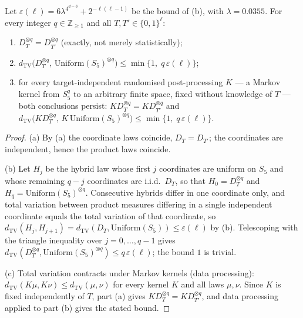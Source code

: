 \documentclass[version=final]{iacrcc}
\newcommand{\dtv}{d_{\mathrm{TV}}}
\begin{document}
\begin{corollary}
\label{cor:terminal}
Let $\varepsilon(\ell) = 6\lambda^{4^{d-3}} + 2^{-\ell(\ell-1)}$ be the bound of
(b), with $\lambda = 0.0355$. For every integer
$q \in \mathbb{Z}_{\geq 1}$ and all $T, T' \in \{0,1\}^\ell$:
\begin{enumerate}[label=(\alph*),nosep]
\item $D_T^{\otimes q} = D_{T'}^{\otimes q}$ (exactly, not merely
  statistically);
\item $\dtv\bigl(D_T^{\otimes q},\, \mathrm{Uniform}(S_5)^{\otimes q}\bigr)
  \leq \min\{1,\; q\,\varepsilon(\ell)\}$;
\item for every target-independent randomised post-processing $K$ --- a Markov
  kernel from $S_5^q$ to an arbitrary finite space, fixed without knowledge of
  $T$ --- both conclusions persist:
  $K D_T^{\otimes q} = K D_{T'}^{\otimes q}$ and
  $\dtv\bigl(K D_T^{\otimes q},\, K\,\mathrm{Uniform}(S_5)^{\otimes q}\bigr)
  \leq \min\{1,\; q\,\varepsilon(\ell)\}$.
\end{enumerate}
\end{corollary}

\begin{proof}
(a) By (a) the coordinate laws coincide, $D_T = D_{T'}$; the
coordinates are independent, hence the product laws coincide.

(b) Let $H_j$ be the hybrid law whose first $j$ coordinates are uniform on $S_5$
and whose remaining $q-j$ coordinates are i.i.d.\ $D_T$, so that
$H_0 = D_T^{\otimes q}$ and $H_q = \mathrm{Uniform}(S_5)^{\otimes q}$.
Consecutive hybrids differ in one coordinate only, and total variation between
product measures differing in a single independent coordinate equals the total
variation of that coordinate, so $\dtv(H_j, H_{j+1}) =
\dtv(D_T, \mathrm{Uniform}(S_5)) \leq \varepsilon(\ell)$ by (b).
Telescoping with the triangle inequality over $j = 0, \dots, q-1$ gives
$\dtv(D_T^{\otimes q}, \mathrm{Uniform}(S_5)^{\otimes q}) \leq q\,\varepsilon(\ell)$;
the bound $1$ is trivial.

(c) Total variation contracts under Markov kernels (data processing):
$\dtv(K\mu, K\nu) \leq \dtv(\mu, \nu)$ for every kernel $K$ and all laws
$\mu, \nu$. Since $K$ is fixed independently of $T$, part (a) gives
$K D_T^{\otimes q} = K D_{T'}^{\otimes q}$, and data processing applied to
part (b) gives the stated bound.
\end{proof}
\end{document}

